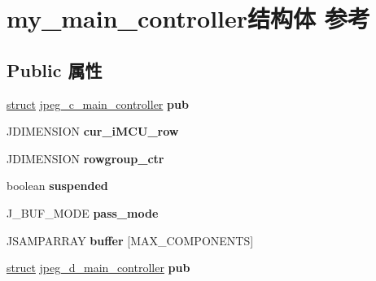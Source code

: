 \hypertarget{structmy__main__controller}{}\section{my\+\_\+main\+\_\+controller结构体 参考}
\label{structmy__main__controller}
\subsection*{Public 属性}
\begin{DoxyCompactItemize}
\item 
\mbox{\label{structmy__main__controller_af6cfb28f856f55e4a715c8036f08c52f}} 
\hyperlink{interfacestruct}{struct} \hyperlink{structjpeg__c__main__controller}{jpeg\+\_\+c\+\_\+main\+\_\+controller} {\bfseries pub}
\item 
\mbox{\label{structmy__main__controller_a1c6081c98910d41e03fa33763a832a6f}} 
J\+D\+I\+M\+E\+N\+S\+I\+ON {\bfseries cur\+\_\+i\+M\+C\+U\+\_\+row}
\item 
\mbox{\label{structmy__main__controller_a41bedbcd86bdc7611550440e02b8f93b}} 
J\+D\+I\+M\+E\+N\+S\+I\+ON {\bfseries rowgroup\+\_\+ctr}
\item 
\mbox{\label{structmy__main__controller_aaae0f416fa5716cf5e0d295a191b2186}} 
boolean {\bfseries suspended}
\item 
\mbox{\label{structmy__main__controller_a2de588274979de6f92951740a6e9d0ac}} 
J\+\_\+\+B\+U\+F\+\_\+\+M\+O\+DE {\bfseries pass\+\_\+mode}
\item 
\mbox{\label{structmy__main__controller_a448676ac307b69b99e5457744515f058}} 
J\+S\+A\+M\+P\+A\+R\+R\+AY {\bfseries buffer} \mbox{[}M\+A\+X\+\_\+\+C\+O\+M\+P\+O\+N\+E\+N\+TS\mbox{]}
\item 
\mbox{\label{structmy__main__controller_a4880459c57978ea5fcfef2a1acbfc3fe}} 
\hyperlink{interfacestruct}{struct} \hyperlink{structjpeg__d__main__controller}{jpeg\+\_\+d\+\_\+main\+\_\+controller} {\bfseries pub}
\item 

\end{DoxyCompactItemize}
